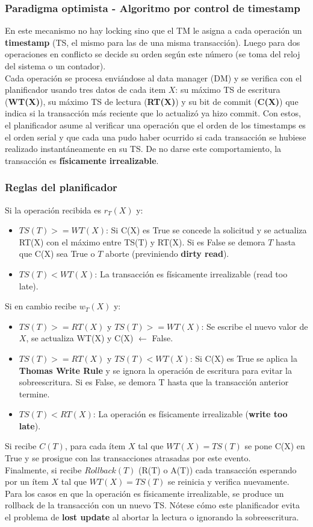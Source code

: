 \subsubsection*{Paradigma optimista - Algoritmo por control de timestamp}
En este mecanismo no hay locking sino que el TM le asigna a cada operación un \textbf{timestamp} (TS, el mismo para las de una misma transacción). Luego para dos operaciones en conflicto se decide su orden según este número (se toma del reloj del sistema o un contador). \\
Cada operación se procesa enviándose al data manager (DM) y se verifica con el planificador usando tres datos de cada item $X$: su máximo TS de escritura (\textbf{WT(X)}), su máximo TS de lectura (\textbf{RT(X)}) y su bit de commit (\textbf{C(X)}) que indica si la transacción más reciente que lo actualizó ya hizo commit. Con estos, el planificador asume al verificar una operación que el orden de los timestamps es el orden serial y que cada una pudo haber ocurrido si cada transacción se hubiese realizado instantáneamente en su TS. De no darse este comportamiento, la transacción es \textbf{físicamente irrealizable}.

\subsubsection*{Reglas del planificador}
Si la operación recibida es $r_T(X)$ y:
\begin{itemize}
    \item $TS(T) >= WT(X)$: Si C(X) es True se concede la solicitud y se actualiza RT(X) con el máximo entre TS(T) y RT(X). Si es False se demora $T$ hasta que C(X) sea True o $T$ aborte (previniendo \textbf{dirty read}).
    \item $TS(T) < WT(X)$: La transacción es físicamente irrealizable (read too late).
\end{itemize}
Si en cambio recibe $w_T(X)$ y:
\begin{itemize}
    \item $TS(T) >= RT(X)$ y $TS(T) >= WT(X)$: Se escribe el nuevo valor de $X$, se actualiza WT(X) y C(X) $\leftarrow$ False.
    \item $TS(T) >= RT(X)$ y $TS(T) < WT(X)$: Si C(X) es True se aplica la \textbf{Thomas Write Rule} y se ignora la operación de escritura para evitar la sobreescritura. Si es False, se demora T hasta que la transacción anterior termine.
    \item $TS(T) < RT(X)$: La operación es físicamente irrealizable (\textbf{write too late}).
\end{itemize}
Si recibe $C(T)$, para cada ítem $X$ tal que $WT(X) = TS(T)$ se pone C(X) en True y se prosigue con las transacciones atrasadas por este evento. \\
Finalmente, si recibe $Rollback(T)$ (R(T) o A(T)) cada transacción esperando por un ítem $X$ tal que $WT(X) = TS(T)$ se reinicia y verifica nuevamente. \\
Para los casos en que la operación es físicamente irrealizable, se produce un rollback de la transacción con un nuevo TS. Nótese cómo este planificador evita el problema de \textbf{lost update} al abortar la lectura o ignorando la sobreescritura.

